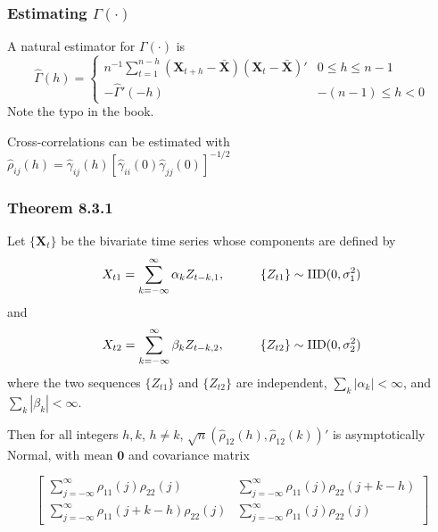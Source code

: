 \documentclass{beamer}
\begin{document}

\begin{frame}
\frametitle{Estimating $\Gamma(\cdot)$}

A natural estimator for $\Gamma(\cdot)$ is 
\[
\hat{\Gamma}(h) = 
\begin{cases}
n^{-1}\sum_{t=1}^{n-h}(\mathbf{X}_{t+h}-\bar{\mathbf{X}} )(\mathbf{X}_{t}-\bar{\mathbf{X}} )' & 0 \le h \le n-1\\
-\hat{\Gamma}'(-h) & -(n-1) \le h < 0 
\end{cases}
\]
Note the typo in the book. 
\newline

Cross-correlations can be estimated with $\hat{\rho}_{ij}(h)= \hat{\gamma}_{ij}(h) [ \hat{\gamma}_{ii}(0)\hat{\gamma}_{jj}(0) ]^{-1/2} $

\end{frame}


\begin{frame}
\frametitle{Theorem 8.3.1}

Let $\{\mathbf{X}_{t}\}$ be the bivariate time series whose components are defined by 
\[
X_{t1} = \sum_{k=-\infty}^{\infty} \alpha_k Z_{t-k,1}, \hspace{10mm} \{Z_{t1}\} \sim \text{IID}(0, \sigma^2_1)
\]
and
\[
X_{t2} = \sum_{k=-\infty}^{\infty} \beta_k Z_{t-k,2}, \hspace{10mm} \{Z_{t2}\} \sim \text{IID}(0, \sigma^2_2)
\]
where the two sequences $\{Z_{t1}\}$ and $\{Z_{t2}\}$ are independent, $\sum_k |\alpha_k| < \infty$,  and $\sum_k |\beta_k| < \infty$.

Then for all integers $h,k$, $h \neq k$, $\sqrt{n}(\hat{\rho}_{12}(h), \hat{\rho}_{12}(k))'$ is asymptotically Normal, with mean $\bm{0}$ and covariance matrix

\[
\left[\begin{array}{cc}
\sum_{j=-\infty}^{\infty} \rho_{11}(j)\rho_{22}(j) & \sum_{j=-\infty}^{\infty}\rho_{11}(j)\rho_{22}(j+k-h)  \\
\sum_{j=-\infty}^{\infty}\rho_{11}(j+k-h)\rho_{22}(j) & \sum_{j=-\infty}^{\infty} \rho_{11}(j)\rho_{22}(j)
\end{array}\right]
\] 


\end{frame}

\end{document}
